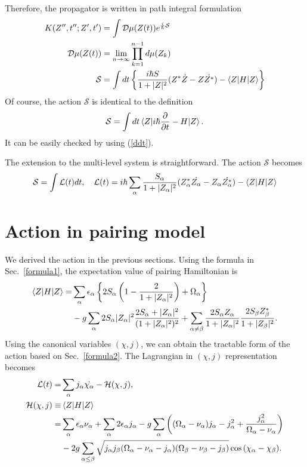 \documentclass[11pt]{book} %
\begin{document}
Therefore, the propagator is written in path integral formulation
\begin{align}
    K(Z'',t'';Z',t') &= \int \mathcal{D}\mu(Z(t))e^{\frac{i}{\hbar}\mathcal{S}} \\
     \mathcal{D}\mu(Z(t)) &= \lim_{n \to \infty} \prod_{k=1}^{n-1}d\mu(Z_k) \\
    \mathcal{S} &= \int dt \left\{ \frac{i\hbar S}{1+|Z|^2}(Z^*\dot{Z}-Z\dot{Z^*})
    -\braket{Z|H|Z} \right\}
\end{align}
Of course, the action $\mathcal{S}$ is identical to the definition
\begin{align}
  \mathcal{S} = \int dt \braket{Z|i\hbar\frac{\partial}{\partial t}-H|Z} .
\end{align}
It can be easily checked by using (\ref{ddt}).

The extension to the multi-level system is straightforward. The action $\mathcal{S}$ becomes
\begin{equation}
  \mathcal{S} = \int \mathcal{L}(t) dt, \quad 
  \mathcal{L}(t) =i\hbar \sum_{\alpha} \frac{S_{\alpha}}{1+|Z_{\alpha}|^2}
  (Z_{\alpha}^*\dot{Z_{\alpha}}-Z_{\alpha}\dot{Z_{\alpha}^*}) - \braket{Z|H|Z}
\end{equation}

\section{Action in pairing model}
We derived the action in the previous sections. Using the formula in Sec.~\ref{formula1}, the expectation value of pairing Hamiltonian is
\begin{align}
  \braket{Z|H|Z} =& \sum_{\alpha} \epsilon_{\alpha} \left\{ 2S_{\alpha}\left( 1-\frac{2}{1+|Z_{\alpha}|^2} \right) + \Omega_{\alpha} \right\} \nonumber \\
   &- g\sum_{\alpha} 2S_{\alpha}|Z_{\alpha}|^2\frac{2S_{\alpha}+|Z_{\alpha}|^2}{(1+|Z_{\alpha}|^2)^2}
    + \sum_{\alpha \neq \beta} \frac{2S_{\alpha}Z_{\alpha}}{1+|Z_{\alpha}|^2}\frac{2S_{\beta}Z_{\beta}^*}{1+|Z_{\beta}|^2} .
\end{align}
Using the canonical variables $(\chi,j)$, we can obtain the tractable form of the action based on Sec.~\ref{formula2}. 
The Lagrangian in $(\chi,j)$ representation becomes
\begin{align}
	\mathcal{L}(t) =& \sum_{\alpha} j_{\alpha}\dot{\chi_{\alpha}} - \mathcal{H}(\chi,j) ,\\
	\mathcal{H}(\chi,j) \equiv& \braket{Z|H|Z} \nonumber \\
	=& \sum_{\alpha} \epsilon_{\alpha}\nu_{\alpha} + \sum_{\alpha} 2\epsilon_{\alpha}j_{\alpha} - g\sum_{\alpha} \left( (\Omega_{\alpha}-\nu_{\alpha}) j_{\alpha} - j_{\alpha}^2 +\frac{j_{\alpha}^2}{\Omega_{\alpha}-\nu_{\alpha}} \right) \nonumber \\
	&- 2g\sum_{\alpha\le \beta} \sqrt{j_{\alpha}j_{\beta}(\Omega_{\alpha}-\nu_{\alpha}-j_{\alpha})(\Omega_{\beta}-\nu_{\beta}-j_{\beta})}\cos{(\chi_{\alpha}-\chi_{\beta})}   .
\end{align}
\end{document}
